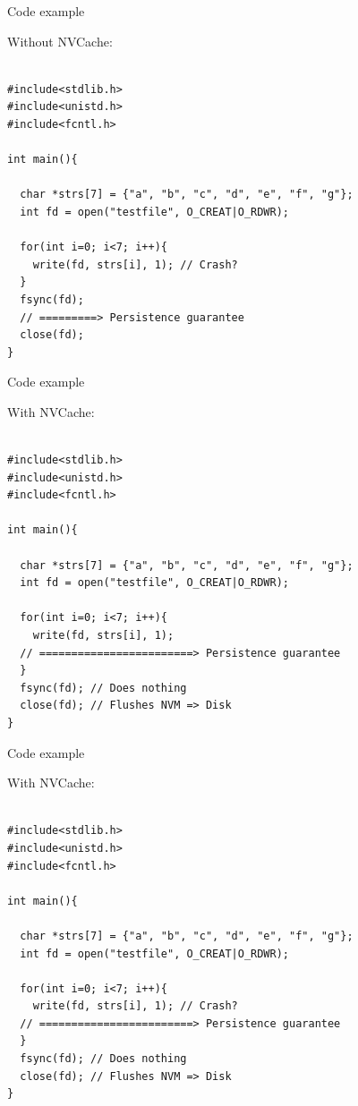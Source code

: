 \documentclass[presentation]{beamer}
\begin{document}
\begin{frame}[label={sec:org594e2d8},fragile]{Code example}
 \begin{block}{Without NVCache:}
\fontsize{8pt}{10pt}\\
\begin{verbatim}

#include<stdlib.h>
#include<unistd.h>
#include<fcntl.h>

int main(){

  char *strs[7] = {"a", "b", "c", "d", "e", "f", "g"};
  int fd = open("testfile", O_CREAT|O_RDWR);

  for(int i=0; i<7; i++){
    write(fd, strs[i], 1); // Crash?
  }
  fsync(fd);
  // =========> Persistence guarantee
  close(fd);
}

\end{verbatim}
\end{block}
\end{frame}

\begin{frame}[label={sec:org6068e3f},fragile]{Code example}
 \begin{block}{With NVCache:}
\fontsize{8pt}{10pt}\\
\begin{verbatim}

#include<stdlib.h>
#include<unistd.h>
#include<fcntl.h>

int main(){

  char *strs[7] = {"a", "b", "c", "d", "e", "f", "g"};
  int fd = open("testfile", O_CREAT|O_RDWR);

  for(int i=0; i<7; i++){
    write(fd, strs[i], 1);
  // ========================> Persistence guarantee
  }
  fsync(fd); // Does nothing
  close(fd); // Flushes NVM => Disk
}

\end{verbatim}
\end{block}
\end{frame}

\begin{frame}[label={sec:org54ce817},fragile]{Code example}
 \begin{block}{With NVCache:}
\fontsize{8pt}{10pt}\\
\begin{verbatim}

#include<stdlib.h>
#include<unistd.h>
#include<fcntl.h>

int main(){

  char *strs[7] = {"a", "b", "c", "d", "e", "f", "g"};
  int fd = open("testfile", O_CREAT|O_RDWR);

  for(int i=0; i<7; i++){
    write(fd, strs[i], 1); // Crash?
  // ========================> Persistence guarantee
  }
  fsync(fd); // Does nothing
  close(fd); // Flushes NVM => Disk
}

\end{verbatim}
\end{block}
\end{frame}
\end{document}
